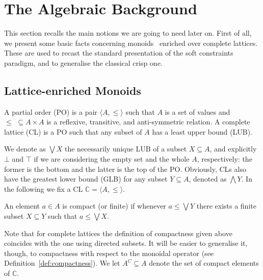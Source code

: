 \documentclass[main.tex]{subfiles}
\begin{document}
\section{The Algebraic Background}\label{sec:background}

This section recalls the main notions we are going to need later on. First of all, we present some basic facts 
concerning monoids~\cite{CLIM} enriched over complete lattices. These are used to recast the standard 
presentation of the soft constraints paradigm, and to generalise the classical crisp one.
%

\subsection{Lattice-enriched Monoids}\label{sec:lem}
\begin{definition}
A partial order (PO) is a pair $\langle A, \leq \rangle$ such that
$A$ is a set of values and $\leq \,\,\subseteq A \times A$ is a reflexive, transitive, and
anti-symmetric  relation.
A complete lattice (CL) is a PO such that any subset of $A$ has a least upper bound (LUB).
\end{definition}

We denote as $\bigvee X$ the necessarily unique LUB of a subset $X \subseteq A$, and explicitly $\bot$ and $\top$ if
we are considering the empty set and the whole $A$, respectively: the former is the bottom and
the latter is the top of the PO.
%
Obviously, CLs also have the greatest lower bound (GLB) for any subset $Y \subseteq A$, denoted as $\bigwedge Y$.
In the following we fix a CL ${\mathbb C} = \langle A, \leq \rangle$.

\begin{definition}
An element $a \in A$ is compact (or finite) if whenever $a \leq \bigvee Y$ there exists a finite subset
$X \subseteq Y$ such that $a \leq \bigvee X$.
%
\end{definition}


Note that for complete lattices the definition of compactness given above coincides with the one using
directed subsets. It will be easier to generalise it, though, to compactness with respect to the monoidal operator (see Definition~\ref{def:compactness}).
%
We let $A^C \subseteq A$ denote the set of compact elements of ${\mathbb C}$. 
\end{document}

